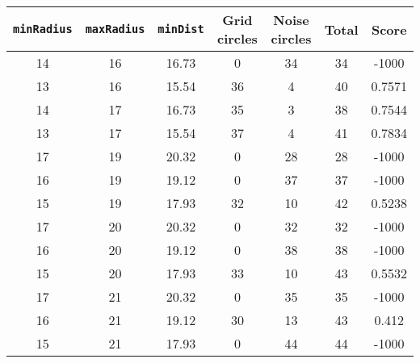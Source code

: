 \documentclass[letterpaper, 12pt]{article}
\begin{document}
\begin{longtable}{|c|c|c|c|c|c|c|}
\hline
\textbf{\texttt{minRadius}} & \textbf{\texttt{maxRadius}} & \textbf{\texttt{minDist}} & \textbf{Grid circles} & \textbf{Noise circles} & \textbf{Total} & \textbf{Score} \\
\hline
14 & 16 & 16.73 & 0 & 34 & 34 & -1000 \\
\hline
13 & 16 & 15.54 & 36 & 4 & 40 & 0.7571 \\
\hline
14 & 17 & 16.73 & 35 & 3 & 38 & 0.7544 \\
\hline
13 & 17 & 15.54 & 37 & 4 & 41 & 0.7834 \\
\hline
17 & 19 & 20.32 & 0 & 28 & 28 & -1000 \\
\hline
16 & 19 & 19.12 & 0 & 37 & 37 & -1000 \\
\hline
15 & 19 & 17.93 & 32 & 10 & 42 & 0.5238 \\
\hline
17 & 20 & 20.32 & 0 & 32 & 32 & -1000 \\
\hline
16 & 20 & 19.12 & 0 & 38 & 38 & -1000 \\
\hline
15 & 20 & 17.93 & 33 & 10 & 43 & 0.5532 \\
\hline
17 & 21 & 20.32 & 0 & 35 & 35 & -1000 \\
\hline
16 & 21 & 19.12 & 30 & 13 & 43 & 0.412 \\
\hline
15 & 21 & 17.93 & 0 & 44 & 44 & -1000 \\
\hline
\end{longtable}
\end{document}

